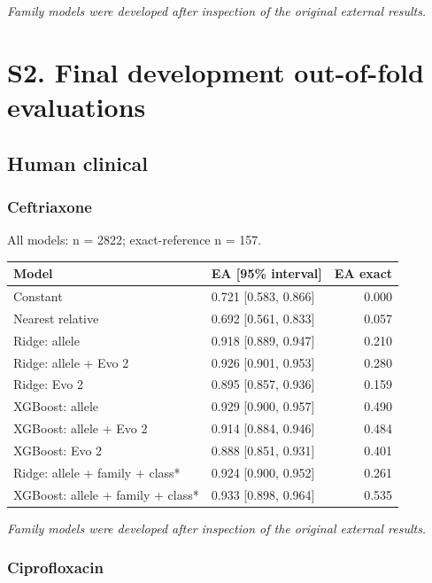 \documentclass[
  10pt,
]{article}
\newcounter{none} %
\begin{document}
\emph{Family models were developed after inspection of the original
external results.}

\section{S2. Final development out-of-fold
evaluations}\label{s2.-final-development-out-of-fold-evaluations}

\subsection{Human clinical}\label{human-clinical-1}

\subsubsection{Ceftriaxone}\label{ceftriaxone-2}

All models: n = 2822; exact-reference n = 157.

{\def\LTcaptype{none} %
\begin{longtable}[]{@{}llr@{}}
\toprule\noalign{}
Model & EA {[}95\% interval{]} & EA exact \\
\midrule\noalign{}
\endhead
\bottomrule\noalign{}
\endlastfoot
Constant & 0.721 {[}0.583, 0.866{]} & 0.000 \\
Nearest relative & 0.692 {[}0.561, 0.833{]} & 0.057 \\
Ridge: allele & 0.918 {[}0.889, 0.947{]} & 0.210 \\
Ridge: allele + Evo 2 & 0.926 {[}0.901, 0.953{]} & 0.280 \\
Ridge: Evo 2 & 0.895 {[}0.857, 0.936{]} & 0.159 \\
XGBoost: allele & 0.929 {[}0.900, 0.957{]} & 0.490 \\
XGBoost: allele + Evo 2 & 0.914 {[}0.884, 0.946{]} & 0.484 \\
XGBoost: Evo 2 & 0.888 {[}0.851, 0.931{]} & 0.401 \\
Ridge: allele + family + class* & 0.924 {[}0.900, 0.952{]} & 0.261 \\
XGBoost: allele + family + class* & 0.933 {[}0.898, 0.964{]} & 0.535 \\
\end{longtable}
}

\emph{Family models were developed after inspection of the original
external results.}

\subsubsection{Ciprofloxacin}\label{ciprofloxacin-2}
\end{document}
